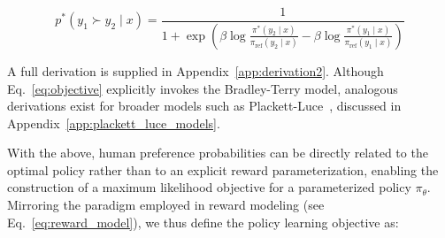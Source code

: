 \begin{equation}\label{eq:objective}
    p^*(y_1\succ y_2 \mid x)=\frac{1}{1 + \exp\left(\beta \log \frac{\pi^*(y_2\mid x)}{\pi_\text{ref}(y_2\mid x)} - \beta \log \frac{\pi^*(y_1\mid x)}{\pi_\text{ref}(y_1\mid x)}\right)}
\end{equation}

A full derivation is supplied in Appendix~\ref{app:derivation2}. Although Eq.~\ref{eq:objective} explicitly invokes the Bradley-Terry model, analogous derivations exist for broader models such as Plackett-Luce~\citep{plackett1975analysis, luce2012individual}, discussed in Appendix~\ref{app:plackett_luce_models}.

With the above, human preference probabilities can be directly related to the optimal policy rather than to an explicit reward parameterization, enabling the construction of a maximum likelihood objective for a parameterized policy $\pi_\theta$. Mirroring the paradigm employed in reward modeling (see Eq.~\ref{eq:reward_model}), we thus define the policy learning objective as:

